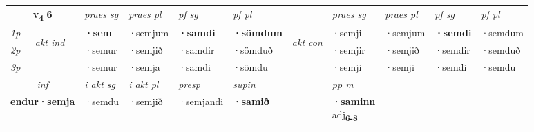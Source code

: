 \noindent
\begin{tabular}{lllllllllll} \toprule
\multicolumn{2}{c}{\textbf{v{\textsubscript{4}}} \Large{\textbf{6}}}  &  \textit{praes sg}  & \textit{praes pl}  &\textit{ pf sg} & \textit{pf pl} &  &  \textit{praes sg}  & \textit{praes pl}  & \textit{pf sg} & \textit{pf pl } \\*
	\cmidrule{3-6} \cmidrule{8-11}
 {\textit{1p}} & \multirow{3}{*}{\begin{turn}{90}\textit{akt ind}\end{turn}} & \textbf{·sem} & ·semjum & \textbf{·samdi} & \textbf{·sömdum} & \multirow{3}{*}{\begin{turn}{90}\textit{akt con}\end{turn}} &·semji & ·semjum & \textbf{·semdi} & ·semdum\\*
 {\textit{2p}} &  &  ·semur  & ·semjið & ·samdir & ·sömduð & & ·semjir & ·semjið & ·semdir & ·semduð \\*
{\textit{3p}} &  & ·semur & ·semja & ·samdi & ·sömdu & & ·semji & ·semji& ·semdi & ·semdu \\*
\cmidrule{3-6} \cmidrule{8-11}

   \multicolumn{2}{c}{\textit{inf}}  & \textit{i akt sg} & \textit{i akt pl}   & \textit{presp} & \textit{supin}  && \textit{pp m} \\*
  \multicolumn{2}{c}{\textbf{endur\allowbreak ·semja}} & ·semdu  & ·semjið   & ·semjandi &  \textbf{·samið}  && \specialcell{\textbf{·saminn} \\ adj\textbf{\textsubscript{6-8}}} \\*
\end{tabular}

